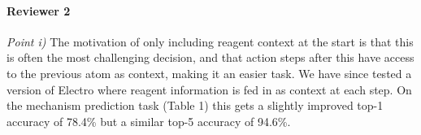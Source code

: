 \documentclass{article}
\begin{document}
% 




\paragraph{Reviewer 2}
\emph{Point i)}
The motivation of only including reagent context at the start is that this is often the most challenging decision, and that action steps after this have access to the previous atom as context, making it an easier task.
We have since tested a version of Electro where reagent information is fed in as context at each step. 
On the mechanism prediction task (Table 1) this gets a slightly improved top-1 accuracy of 78.4\% but a similar top-5 accuracy of 94.6\%.
\end{document}
